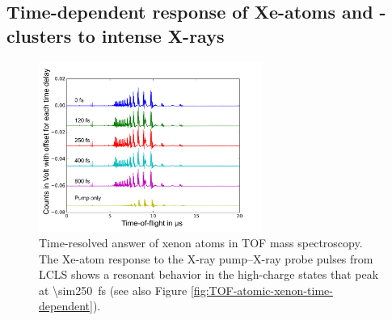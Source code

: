 \subsection{Time-dependent response of Xe-atoms and -clusters to intense X-rays}\label{sec:time-resolved-xe-atoms}
\begin{figure}
	\centering
		\includegraphics[width=0.65\textwidth]{images/results/TOF-atomic-xenon2.png}
	\caption[Time-resolved answer of xenon atoms in TOF spectroscopy.]{Time-resolved answer of xenon atoms in TOF mass spectroscopy. The Xe-atom response to the X-ray pump--X-ray probe pulses from LCLS shows a resonant behavior in the high-charge states that peak at \SI{\sim250}{\femto\second} (see also Figure \ref{fig:TOF-atomic-xenon-time-dependent}).}
	\label{fig:TOF-traces-xenon-atoms}
\end{figure}
